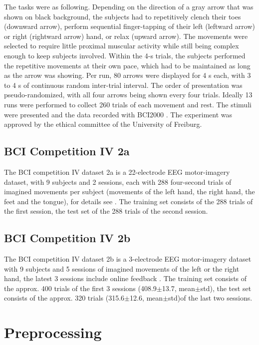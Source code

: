 The tasks were as following. Depending on the direction of a gray arrow
that was shown on black background, the subjects had to repetitively
clench their toes (downward arrow), perform sequential finger-tapping of
their left (leftward arrow) or right (rightward arrow) hand, or relax
(upward arrow). The movements were selected to require little proximal
muscular activity while still being complex enough to keep subjects
involved. Within the 4-s trials, the subjects performed the repetitive
movements at their own pace, which had to be maintained as long as the
arrow was showing. Per run, 80 arrows were displayed for 4 s each, with
3 to 4 s of continuous random inter-trial interval. The order of
presentation was pseudo-randomized, with all four arrows being shown
every four trials. Ideally 13 runs were performed to collect 260 trials
of each movement and rest. The stimuli were presented and the data
recorded with BCI2000 \citep{schalk_bci2000:_2004}. The
experiment was approved by the ethical committee of the University of
Freiburg.

\subsection{BCI Competition IV 2a}\label{bci-competition-iv-2a}

    The BCI competition IV dataset 2a is a 22-electrode EEG motor-imagery
dataset, with 9 subjects and 2 sessions, each with 288 four-second
trials of imagined movements per subject (movements of the left hand,
the right hand, the feet and the tongue), for details see
\citet{brunner_bci_2008}. The training set consists of the
288 trials of the first session, the test set of the 288 trials of the
second session.

\subsection{BCI Competition IV 2b}\label{bci-competition-iv-2b}

    The BCI competition IV dataset 2b is a 3-electrode EEG motor-imagery
dataset with 9 subjects and 5 sessions of imagined movements of the left
or the right hand, the latest 3 sessions include online feedback
\citep{leeb_bci_2008}. The training set consists of the
approx. 400 trials of the first 3 sessions
(408.9$\pm$13.7, mean$\pm$std), the test set consists of the approx. 320 trials (315.6$\pm$12.6, mean$\pm$std)of the last two sessions.

\section{Preprocessing}\label{preprocessing}

